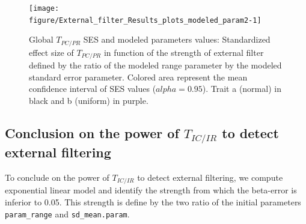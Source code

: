 \documentclass[12pt]{article}\usepackage[]{graphicx}\usepackage[]{color}
\newenvironment{knitrout}{}{} %
\begin{document}
\begin{knitrout}
\begin{figure}
{\centering \texttt{[image: figure/External\_filter\_Results\_plots\_modeled\_param2-1]} 

}

\caption[Global $T_{PC/PR}$ SES and modeled parameters values]{Global $T_{PC/PR}$ SES and modeled parameters values: Standardized effect size of $T_{PC/PR}$ in function of the strength of external filter defined by the ratio of the modeled range parameter by the modeled standard error parameter. Colored area represent the mean confidence interval of SES values ($alpha = 0.95$). Trait a (normal) in black and b (uniform) in purple.\label{fig:External_filter_Results_plots_modeled_param2}}
\end{figure}


\end{knitrout}


  \subsection {Conclusion on the power of $T_{IC/IR}$ to detect external filtering}

To conclude on the power of $T_{IC/IR}$ to detect external filtering, we compute exponential linear model and identify the strength from which the beta-error is inferior to 0.05. This strength is define by the two ratio of the initial parameters \texttt{param\_range} and \texttt{sd\_mean.param}. 
\end{document}
